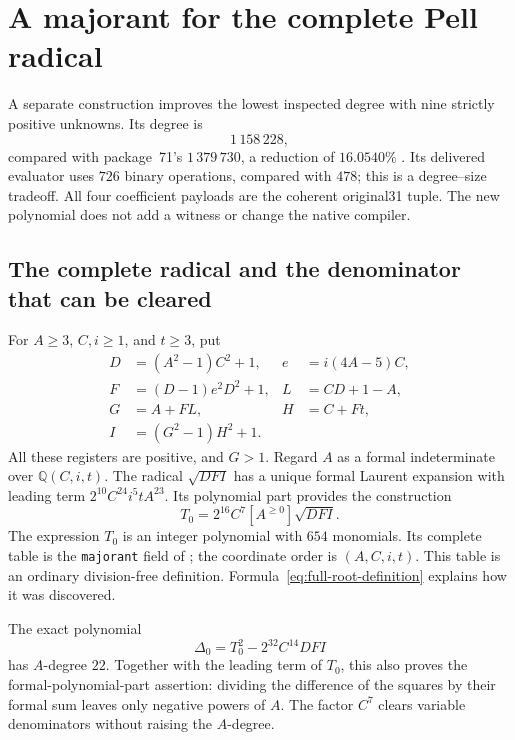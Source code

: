 \section{A majorant for the complete Pell radical}
\label{sec:full-radical}

A separate construction improves the lowest inspected degree with nine
strictly positive unknowns. Its degree is
\[
 \boxed{1\,158\,228},
\]
compared with package~71's $1\,379\,730$, a reduction of $16.0540\%$
\cite{source71}.
Its delivered evaluator uses $726$ binary operations, compared with $478$;
this is a degree--size tradeoff. All four coefficient payloads are the
coherent original31 tuple. The new polynomial does not add a witness or
change the native compiler.

\subsection{The complete radical and the denominator that can be cleared}

For $A\ge3$, $C,i\ge1$, and $t\ge3$, put
\begin{align*}
 D&=(A^2-1)C^2+1,& e&=i(4A-5)C,\\
 F&=(D-1)e^2D^2+1,& L&=CD+1-A,\\
 G&=A+FL,& H&=C+Ft,\\
 I&=(G^2-1)H^2+1.
\end{align*}
All these registers are positive, and $G>1$. Regard $A$ as a formal
indeterminate over $\mathbb Q(C,i,t)$. The radical $\sqrt{DFI}$ has a unique
formal Laurent expansion with leading term
$2^{10}C^{24}i^5tA^{23}$. Its polynomial part provides the construction
\begin{equation}
 T_0=2^{16}C^7[A^{\ge0}]\sqrt{DFI}.
 \label{eq:full-root-definition}
\end{equation}
The expression $T_0$ is an integer polynomial with $654$ monomials. Its
complete table is the \texttt{majorant} field of
; the coordinate order is
$(A,C,i,t)$. This table is an ordinary division-free definition.
Formula~\eqref{eq:full-root-definition} explains how it was discovered.

The exact polynomial
\begin{equation}
 \Delta_0=T_0^2-2^{32}C^{14}DFI
 \label{eq:full-root-defect}
\end{equation}
has $A$-degree $22$. Together with the leading term of $T_0$, this also
proves the formal-polynomial-part assertion: dividing the difference of
the squares by their formal sum leaves only negative powers of $A$.
The factor $C^7$ clears variable denominators without raising the
$A$-degree.

